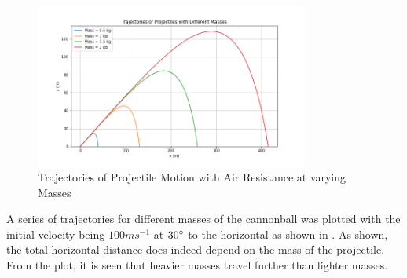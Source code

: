 \documentclass[11pt]{article}
\begin{document}
 \begin{figure}[!h]\begin{center} 
 		\vspace{12pt}
 		\includegraphics[width=0.8\textwidth]{projectiles.png} 
 		\caption{Trajectories of Projectile Motion with Air Resistance at varying Masses}
 		\label{fig:projectile} 
 	\end{center}
 \end{figure}
 A series of trajectories for different masses of the cannonball was plotted with the initial velocity being $100 ms^{-1}$ at $30\degree$ to the horizontal as shown in . As shown, the total horizontal distance does indeed depend on the mass of the projectile. From the plot, it is seen that heavier masses travel further than lighter masses.
\end{document}
